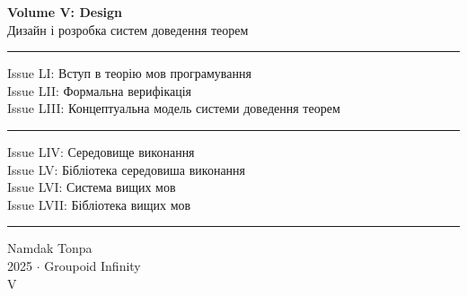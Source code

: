 \documentclass{book}
\begin{document}
\begin{titlepage}
    \centering
    \vspace*{0.5in}
    \Huge
    \textbf{Volume V: Design} \\
    \LARGE
    Дизайн і розробка систем доведення теорем \\
    \vspace{1.5in}
    \small
    \flushleft
    \vspace{-2mm} \rule{\textwidth}{0.4pt}
    Issue LI: Вступ в теорію мов програмування \\
    Issue LII: Формальна верифікація \\
    Issue LIII: Концептуальна модель системи доведення теорем \\
    \vspace{-2mm} \rule{\textwidth}{0.4pt}
    Issue LIV: Середовище виконання \\
    Issue LV: Бібліотека середовиша виконання \\
    Issue LVI: Система вищих мов \\
    Issue LVII: Бібліотека вищих мов \\
    \vspace{-2mm} \rule{\textwidth}{0.4pt}
    \centering
    \vfill
    \large
    Namdak Tonpa \\
    \Large
    2025 $\cdot$ Groupoid Infinity \\
    V
\end{titlepage}

\tableofcontents
\newif\ifincludeTOC










\end{document}
